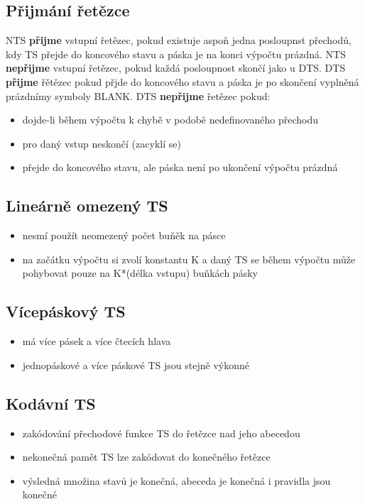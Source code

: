 \documentclass{../../szzclass}
\begin{document}
\subsection{Přijmání řetězce}
NTS \textbf{přijme} vstupní řetězec, pokud existuje aspoň jedna posloupnst přechodů, kdy TS přejde do koncového stavu a páska je na konci výpočtu prázdná.
\newline
NTS \textbf{nepřijme} vstupní řetězec, pokud každá posloupnost skončí jako u DTS.
\newline
\newline
DTS \textbf{přijme} řětězec pokud přjde do koncového stavu a páska je po skončení vyplněná prázdnímy symboly BLANK.
\newline
DTS \textbf{nepřijme} řetězec pokud:
\begin{itemize}
    \item dojde-li během výpočtu k chybě v podobě nedefinovaného přechodu
    \item pro daný vstup neskončí (zacyklí se)
    \item přejde do koncového stavu, ale páska není po ukončení výpočtu prázdná
\end{itemize}

\subsection{Lineárně omezený TS}
\begin{itemize}
	\item nesmí použít neomezený počet buňěk na pásce
	\item na začátku výpočtu si zvolí konstantu K a daný TS se během výpočtu může pohybovat pouze na K*(délka vstupu) buňkách pásky
\end{itemize}

\subsection{Vícepáskový TS}
\begin{itemize}
    \item má více pásek a více čtecích hlava
    \item jednopáskové a více páskové TS jsou stejně výkonné 
\end{itemize}
\subsection{Kodávní TS}
\begin{itemize}
    \item zakódování přechodové funkce TS do řetězce nad jeho abecedou
    \item nekonečná pamět TS lze zakódovat do konečného řetězce
    \item výsledná množina stavů je konečná, abeceda je konečná i pravidla jsou konečné
\end{itemize}
\end{document}
